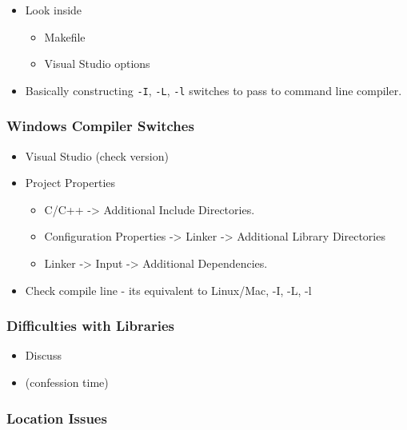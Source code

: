 \begin{itemize}
\itemsep1pt\parskip0pt
\item
  Look inside

  \begin{itemize}
  \itemsep1pt\parskip0pt
  \item
    Makefile
  \item
    Visual Studio options
  \end{itemize}
\item
  Basically constructing \texttt{-I}, \texttt{-L}, \texttt{-l} switches
  to pass to command line compiler.
\end{itemize}

\subsubsection{Windows Compiler
Switches}\label{windows-compiler-switches}

\begin{itemize}
\itemsep1pt\parskip0pt
\item
  Visual Studio (check version)
\item
  Project Properties

  \begin{itemize}
  \itemsep1pt\parskip0pt
  \item
    C/C++ -\textgreater{} Additional Include Directories.
  \item
    Configuration Properties -\textgreater{} Linker -\textgreater{}
    Additional Library Directories
  \item
    Linker -\textgreater{} Input -\textgreater{} Additional
    Dependencies.
  \end{itemize}
\item
  Check compile line - its equivalent to Linux/Mac, -I, -L, -l
\end{itemize}

\subsubsection{Difficulties with
Libraries}\label{difficulties-with-libraries}

\begin{itemize}
\itemsep1pt\parskip0pt
\item
  Discuss
\item
  (confession time)
\end{itemize}

\subsubsection{Location Issues}\label{location-issues}

